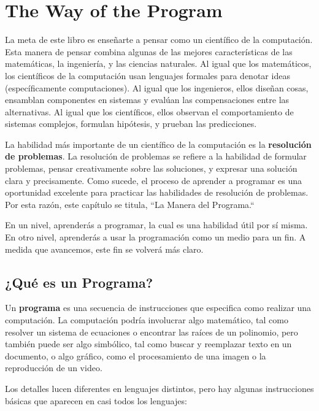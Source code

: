 \chapter{The Way of the Program}

La meta de este libro es enseñarte a pensar como un científico de la 
computación. Esta manera de pensar combina algunas de las mejores características
de las matemáticas, la ingeniería, y las ciencias naturales. Al igual que los
matemáticos, los científicos de la computación usan lenguajes formales para denotar
ideas (específicamente computaciones). Al igual que los ingenieros, ellos diseñan cosas,
ensamblan componentes en sistemas y evalúan las compensaciones entre las alternativas.
Al igual que los científicos, ellos observan el comportamiento de sistemas complejos, 
formulan hipótesis, y prueban las predicciones. 

La habilidad más importante de un científico de la computación
es la {\bf resolución de problemas}. La resolución de problemas se refiere
a la habilidad de formular problemas, pensar creativamente sobre las
soluciones, y expresar una solución clara y precisamente. Como sucede, 
el proceso de aprender a programar es una oportunidad excelente para practicar 
las habilidades de resolución de problemas. Por esta razón, este capítulo se titula,
 ``La Manera del Programa.``

En un nivel, aprenderás a programar, la cual es una habilidad útil por sí misma.
En otro nivel, aprenderás a usar la programación como un medio para un fin. 
A medida que avancemos, este fin se volverá más claro.


\section{¿Qué es un Programa?}

Un {\bf programa} es una secuencia de instrucciones que especifica
como realizar una computación. La computación podría involucrar 
algo matemático, tal como resolver un sistema de ecuaciones o 
encontrar las raíces de un polinomio, pero también puede ser algo
simbólico, tal como buscar y reemplazar texto en un documento, o 
algo gráfico, como el procesamiento de una imagen o la reproducción 
de un video.

Los detalles lucen diferentes en lenguajes distintos, pero hay algunas
instrucciones básicas que aparecen en casi todos los lenguajes:

